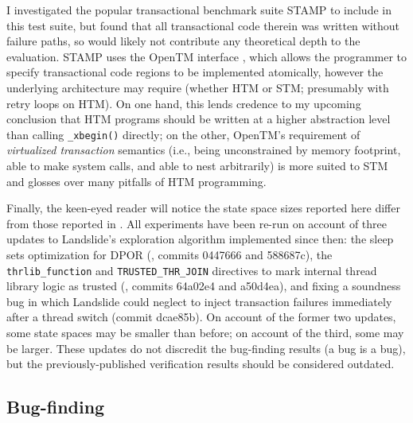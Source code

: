 I investigated the popular transactional benchmark suite STAMP \cite{stamp}
to include in this test suite,
but found that all transactional code therein was written without failure paths,
so would likely not contribute any theoretical depth to the evaluation.
STAMP uses the OpenTM interface \cite{opentm},
which allows the programmer to specify transactional code regions to be implemented atomically,
however the underlying architecture may require
(whether HTM or STM; presumably with retry loops on HTM).
On one hand,
this lends credence to my upcoming conclusion
that HTM programs should be written at a higher abstraction level than calling {\tt \_xbegin()} directly;
on the other,
OpenTM's requirement of {\em virtualized transaction} semantics
(i.e., being unconstrained by memory footprint, able to make system calls, and able to nest arbitrarily)
is more suited to STM and glosses over many pitfalls of HTM programming.

Finally, the keen-eyed reader will notice the state space sizes reported here
differ from those reported in \cite{sigbovik-htm}.
All experiments have been re-run
on account of three updates to Landslide's exploration algorithm
implemented since then:
the sleep sets optimization for DPOR (\sect{\ref{sec:landslide-sleepsets}}, commits 0447666 and 588687c),
the {\tt thrlib\_function} and {\tt TRUSTED\_THR\_JOIN} directives
to mark internal thread library logic as trusted
(\sect{\ref{sec:landslide-config-landslide}}, commits 64a02e4 and a50d4ea),
and fixing a soundness bug in which Landslide could neglect to inject transaction failures
immediately after a thread switch (commit dcae85b).
On account of the former two updates, some state spaces may be smaller than before;
on account of the third, some may be larger.
These updates do not discredit the bug-finding results (a bug is a bug),
but the previously-published verification results should be considered outdated.

\newcommand\ETA[1]{\hilight{brownish}{{\em #1}}\xspace}
\newcommand\cpu[1]{\hilight{darkcyan}{{#1}}\xspace}
\newcommand\wtm[1]{\hilight{lime}{{#1}}\xspace}
\newcommand\ints[1]{\hilight{pinkish}{{#1}}\xspace}
\newcommand\ETAdag[1]{\ETA{\ensuremath{\dagger}#1}}

\subsection{Bug-finding}
\label{sec:tm-eval-bugs}

